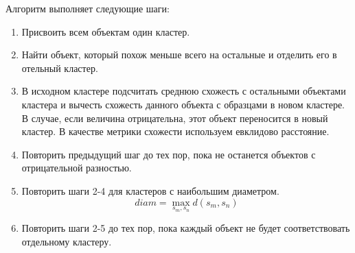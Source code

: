 \documentclass[12pt, a4paper]{article}
\begin{document}
Алгоритм выполняет следующие шаги:
\begin{enumerate}


\item Присвоить всем объектам один кластер.


\item Найти объект, который похож меньше всего на остальные и отделить его в отельный кластер.


\item В исходном кластере подсчитать среднюю схожесть с остальными объектами кластера и вычесть схожесть данного объекта с образцами в новом кластере. В случае, если величина отрицательна, этот объект переносится в новый кластер. В качестве метрики схожести используем евклидово расстояние.

\item Повторить предыдущий шаг до тех пор, пока не останется объектов с отрицательной разностью.

\item Повторить шаги 2-4 для кластеров с наибольшим диаметром.
\[
diam = \max_{s_m, s_n} d(s_m, s_n)
\]

\item Повторить шаги 2-5 до тех пор, пока каждый объект не будет соответствовать отдельному кластеру.
\end{enumerate}
\end{document}
